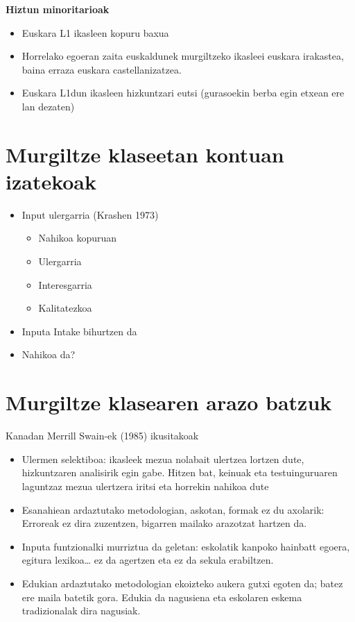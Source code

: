 \documentclass[
]{book}
\providecommand{\tightlist}{%
  \setlength{\itemsep}{0pt}\setlength{\parskip}{0pt}}
\begin{document}
\textbf{Hiztun minoritarioak}

\begin{itemize}
\tightlist
\item
  Euskara L1 ikasleen kopuru baxua
\item
  Horrelako egoeran zaita euskaldunek murgiltzeko ikasleei euskara irakastea, baina erraza euskara castellanizatzea.
\item
  Euskara L1dun ikasleen hizkuntzari eutsi (gurasoekin berba egin etxean ere lan dezaten)
\end{itemize}

\hypertarget{murgiltze-klaseetan-kontuan-izatekoak}{%
\section{Murgiltze klaseetan kontuan izatekoak}\label{murgiltze-klaseetan-kontuan-izatekoak}}

\begin{itemize}
\tightlist
\item
  Input ulergarria (Krashen 1973)

  \begin{itemize}
  \tightlist
  \item
    Nahikoa kopuruan
  \item
    Ulergarria
  \item
    Interesgarria
  \item
    Kalitatezkoa
  \end{itemize}
\item
  Inputa Intake bihurtzen da
\item
  Nahikoa da?
\end{itemize}

\hypertarget{murgiltze-klasearen-arazo-batzuk-1}{%
\section{Murgiltze klasearen arazo batzuk}\label{murgiltze-klasearen-arazo-batzuk-1}}

Kanadan Merrill Swain-ek (1985) ikusitakoak

\begin{itemize}
\tightlist
\item
  Ulermen selektiboa: ikasleek mezua nolabait ulertzea lortzen dute, hizkuntzaren analisirik egin gabe. Hitzen bat, keinuak eta testuinguruaren laguntzaz mezua ulertzera iritsi eta horrekin nahikoa dute
\item
  Esanahiean ardaztutako metodologian, askotan, formak ez du axolarik:
  Erroreak ez dira zuzentzen, bigarren mailako arazotzat hartzen da.
\item
  Inputa funtzionalki murriztua da geletan: eskolatik kanpoko hainbatt egoera, egitura lexikoa\ldots{} ez da agertzen eta ez da sekula erabiltzen.
\item
  Edukian ardaztutako metodologian ekoizteko aukera gutxi egoten da; batez ere maila batetik gora. Edukia da nagusiena eta eskolaren eskema tradizionalak dira nagusiak.
\end{itemize}
\end{document}
